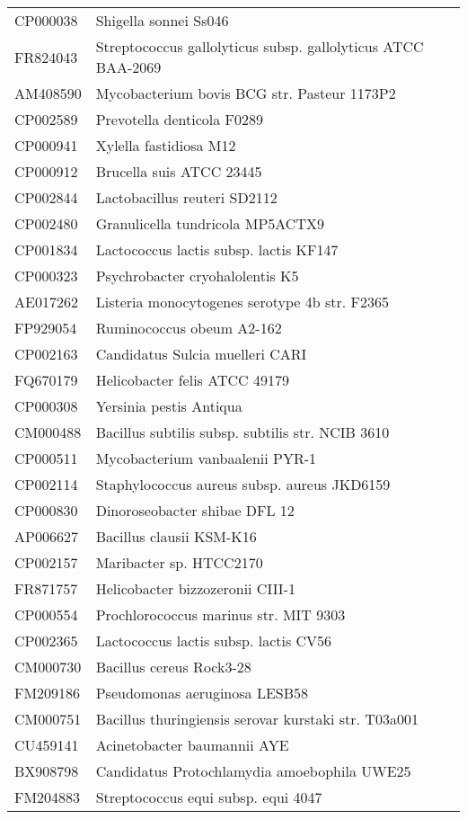 \begin{longtable}{ll}
CP000038 & Shigella sonnei Ss046\\
FR824043 & Streptococcus gallolyticus subsp. gallolyticus ATCC BAA-2069\\
AM408590 & Mycobacterium bovis BCG str. Pasteur 1173P2\\
CP002589 & Prevotella denticola F0289\\
CP000941 & Xylella fastidiosa M12\\
CP000912 & Brucella suis ATCC 23445\\
CP002844 & Lactobacillus reuteri SD2112\\
CP002480 & Granulicella tundricola MP5ACTX9\\
CP001834 & Lactococcus lactis subsp. lactis KF147\\
CP000323 & Psychrobacter cryohalolentis K5\\
AE017262 & Listeria monocytogenes serotype 4b str. F2365\\
FP929054 & Ruminococcus obeum A2-162\\
CP002163 & Candidatus Sulcia muelleri CARI\\
FQ670179 & Helicobacter felis ATCC 49179\\
CP000308 & Yersinia pestis Antiqua\\
CM000488 & Bacillus subtilis subsp. subtilis str. NCIB 3610\\
CP000511 & Mycobacterium vanbaalenii PYR-1\\
CP002114 & Staphylococcus aureus subsp. aureus JKD6159\\
CP000830 & Dinoroseobacter shibae DFL 12\\
AP006627 & Bacillus clausii KSM-K16\\
CP002157 & Maribacter sp. HTCC2170\\
FR871757 & Helicobacter bizzozeronii CIII-1\\
CP000554 & Prochlorococcus marinus str. MIT 9303\\
CP002365 & Lactococcus lactis subsp. lactis CV56\\
CM000730 & Bacillus cereus Rock3-28\\
FM209186 & Pseudomonas aeruginosa LESB58\\
CM000751 & Bacillus thuringiensis serovar kurstaki str. T03a001\\
CU459141 & Acinetobacter baumannii AYE\\
BX908798 & Candidatus Protochlamydia amoebophila UWE25\\
FM204883 & Streptococcus equi subsp. equi 4047\\

\end{longtable}
